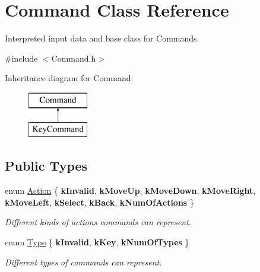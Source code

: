 \hypertarget{class_command}{}\section{Command Class Reference}
\label{class_command}


Interpreted input data and base class for Commands.  




{\ttfamily \#include $<$Command.\+h$>$}

Inheritance diagram for Command\+:\begin{figure}[H]
\begin{center}
\leavevmode
\includegraphics[height=2.000000cm]{class_command}
\end{center}
\end{figure}
\subsection*{Public Types}
\begin{DoxyCompactItemize}
\item 
\mbox{\label{class_command_a45bbda49e9ee96d262ac651fefffe487}} 
enum \mbox{\hyperlink{class_command_a45bbda49e9ee96d262ac651fefffe487}{Action}} \{ \newline
{\bfseries k\+Invalid}, 
{\bfseries k\+Move\+Up}, 
{\bfseries k\+Move\+Down}, 
{\bfseries k\+Move\+Right}, 
\newline
{\bfseries k\+Move\+Left}, 
{\bfseries k\+Select}, 
{\bfseries k\+Back}, 
{\bfseries k\+Num\+Of\+Actions}
 \}
\begin{DoxyCompactList}\small\item\em Different kinds of actions commands can represent. \end{DoxyCompactList}\item 
\mbox{\label{class_command_a4ca33b8d40e12deca5e7bb4190426ee1}} 
enum \mbox{\hyperlink{class_command_a4ca33b8d40e12deca5e7bb4190426ee1}{Type}} \{ {\bfseries k\+Invalid}, 
{\bfseries k\+Key}, 
{\bfseries k\+Num\+Of\+Types}
 \}
\begin{DoxyCompactList}\small\item\em Different types of commands can represent. \end{DoxyCompactList}\end{DoxyCompactItemize}
